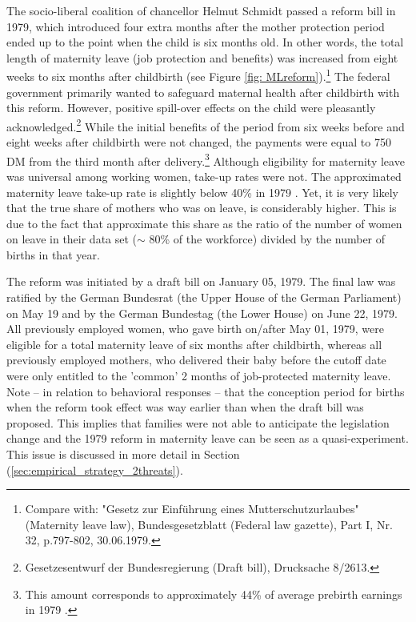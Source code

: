 \documentclass[11pt, a4paper]{article} %
\begin{document}
The socio-liberal coalition of chancellor Helmut Schmidt passed a reform bill in 1979, which introduced four extra months after the mother protection period ended up to the point when the child is six months old. In other words, the total length of maternity leave (job protection and benefits) was increased from eight weeks to six months after childbirth (see Figure \ref{fig: MLreform}).\footnote{Compare with: "Gesetz zur Einführung eines Mutterschutzurlaubes" (Maternity leave law), Bundesgesetzblatt (Federal law gazette), Part I, Nr. 32, p.797-802, 30.06.1979.} The federal government primarily wanted to safeguard maternal health after childbirth with this reform. However, positive spill-over effects on the child were pleasantly acknowledged.\footnote{Gesetzesentwurf der Bundesregierung (Draft bill), Drucksache 8/2613.} While the initial benefits of the period from six weeks before and eight weeks after childbirth were not changed, the payments were equal to 750 DM from the third month after delivery.\footnote{This amount corresponds to approximately 44\% of average prebirth earnings in 1979 \citep{schonberg2014expansions}.} Although eligibility for maternity leave was universal among working women, take-up rates were not. The approximated maternity leave take-up rate is slightly below 40\% in 1979 \citep{Dustmann2012}. Yet, it is very likely that the true share of mothers who was on leave, is considerably higher. This is due to the fact that \cite{Dustmann2012} approximate this share as the ratio of the number of women on leave in their data set ($\sim$ 80\% of the workforce) divided by the number of births in that year.
\newline

The reform was initiated by a draft bill on January 05, 1979. The final law was ratified by the German Bundesrat (the Upper House of the German Parliament) on May 19 and by the German Bundestag (the Lower House) on June 22, 1979.  All previously employed women, who gave birth on/after May 01, 1979, were eligible for a total maternity leave of six months after childbirth, whereas all previously employed mothers, who delivered their baby before the cutoff date were only entitled to the 'common' 2 months of job-protected maternity leave. Note -- in relation to behavioral responses -- that the conception period for births when the reform took effect was way earlier than when the draft bill was proposed. This implies that families were not able to anticipate the legislation change and the 1979 reform in maternity leave can be seen as a quasi-experiment. This issue is discussed in more detail in Section (\ref{sec:empirical_strategy_2threats}).\newline
\end{document}
